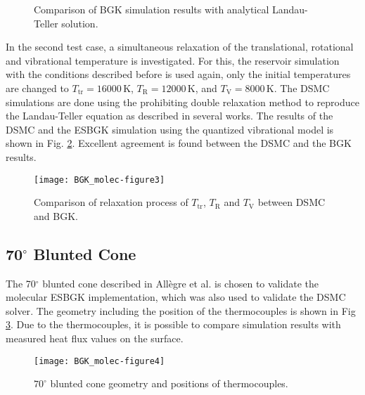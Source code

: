 \documentclass[aip,pof,amsmath,amssymb,preprint]{revtex4-1}
\begin{document}
\begin{figure}
\centering
{}\quad
{}
\caption{Comparison of BGK simulation results with analytical Landau-Teller solution.}
\label{fig:LT_relax}
\end{figure}

In the second test case, a simultaneous relaxation of the translational, rotational and vibrational temperature is investigated. For this, the reservoir simulation with the conditions described before is used again, only the initial
temperatures are changed to $T_{\mathrm{tr}}=16000\,\mathrm{K}$, $T_{\mathrm{R}}=12000\,\mathrm{K}$, and $T_{\mathrm{V}}=8000\,\mathrm{K}$. The DSMC simulations are done using the prohibiting double relaxation method to reproduce the 
Landau-Teller equation as described in several works\cite{Pfeiffer2016b,zhang:2013}.
The results of the DSMC and the ESBGK simulation using the quantized vibrational model is shown in Fig. \ref{fig:compdsmcbgk}. Excellent agreement is found between the DSMC and the BGK results.  

\begin{figure}
\centering
\texttt{[image: BGK\_molec-figure3]}
\caption{Comparison of relaxation process of $T_{\mathrm{tr}}$, $T_{\mathrm{R}}$ and $T_{\mathrm{V}}$ between DSMC
and BGK.}
\label{fig:compdsmcbgk}
\end{figure}

\subsection{70$^\circ$ Blunted Cone}
The 70$^\circ$ blunted cone described in All{\`{e}}gre et al.\cite{Allegre1997} is chosen to validate the molecular ESBGK implementation, which was also used to validate the DSMC solver\cite{Nizenkov2017}.
The geometry including the position of the thermocouples is shown in Fig \ref{fig:70degCone}. 
Due to the thermocouples, it is possible to compare simulation results with measured heat flux values on the surface.
\begin{figure}[ht]
\renewcommand*{\arraystretch}{0.6}
\centering
\texttt{[image: BGK\_molec-figure4]}
\caption{$70^{\circ}$ blunted cone geometry and positions of thermocouples.}\label{fig:70degCone}
\end{figure}
\end{document}
